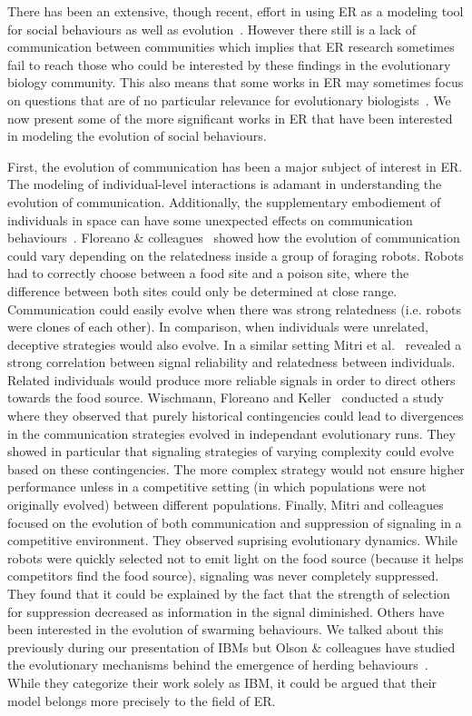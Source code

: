        There has been an extensive, though recent, effort in using ER as a modeling tool for social behaviours as well as evolution~\parencite{Mitri2013, Trianni2014b, Eiben2014, Doncieux2015a}. However there still is a lack of communication between communities which implies that ER research sometimes fail to reach those who could be interested by these findings in the evolutionary biology community. This also means that some works in ER may sometimes focus on questions that are of no particular relevance for evolutionary biologists~\parencite{Trianni2014b, Doncieux2015a}. We now present some of the more significant works in ER that have been interested in modeling the evolution of social behaviours. 

        First, the evolution of communication has been a major subject of interest in ER. The modeling of individual-level interactions is adamant in understanding the evolution of communication. Additionally, the supplementary embodiement of individuals in space can have some unexpected effects on communication behaviours~\parencite{Mitri2009}. Floreano \& colleagues~\parencite{Floreano2007} showed how the evolution of communication could vary depending on the relatedness inside a group of foraging robots. Robots had to correctly choose between a food site and a poison site, where the difference between both sites could only be determined at close range. Communication could easily evolve when there was strong relatedness (i.e. robots were clones of each other). In comparison, when individuals were unrelated, deceptive strategies would also evolve. In a similar setting Mitri et al.~\parencite{Mitri2011} revealed a strong correlation between signal reliability and relatedness between individuals. Related individuals would produce more reliable signals in order to direct others towards the food source. Wischmann, Floreano and Keller~\parencite{Wischmann2012} conducted a study where they observed that purely historical contingencies could lead to divergences in the communication strategies evolved in independant evolutionary runs. They showed in particular that signaling strategies of varying complexity could evolve based on these contingencies. The more complex strategy would not ensure higher performance unless in a competitive setting (in which populations were not originally evolved) between different populations. Finally, Mitri and colleagues~\parencite{Mitri2009} focused on the evolution of both communication and suppression of signaling in a competitive environment. They observed suprising evolutionary dynamics. While robots were quickly selected not to emit light on the food source (because it helps competitors find the food source), signaling was never completely suppressed. They found that it could be explained by the fact that the strength of selection for suppression decreased as information in the signal diminished. Others have been interested in the evolution of swarming behaviours. We talked about this previously during our presentation of IBMs but Olson \& colleagues have studied the evolutionary mechanisms behind the emergence of herding behaviours~\parencite{Olson2013, Olson2013a, Haley2014}. While they categorize their work solely as IBM, it could be argued that their model belongs more precisely to the field of ER.

